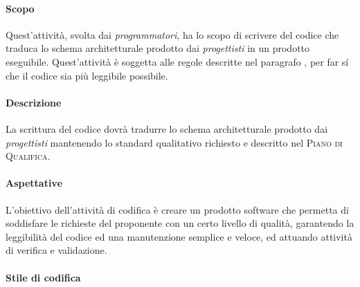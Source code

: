 \paragraph{Scopo}

Quest'attività, svolta dai \emph{programmatori}, ha lo scopo di scrivere del codice che traduca lo schema architetturale
prodotto dai \emph{progettisti} in un prodotto eseguibile. Quest'attività è soggetta alle regole descritte nel paragrafo
, per far sí che il codice sia più leggibile possibile.

\paragraph{Descrizione}

La scrittura del codice dovrà tradurre lo schema architetturale prodotto dai \emph{progettisti} mantenendo lo standard
qualitativo richiesto e descritto nel \textsc{Piano di Qualifica}.

\paragraph{Aspettative}

L'obiettivo dell'attività di codifica è creare un prodotto software che permetta di soddisfare le richieste del
proponente con un certo livello di qualità, garantendo la leggibilità del codice ed una manutenzione semplice e veloce,
ed attuando attività di verifica e validazione.

\paragraph{Stile di codifica}
\label{par:stile_codifica}

